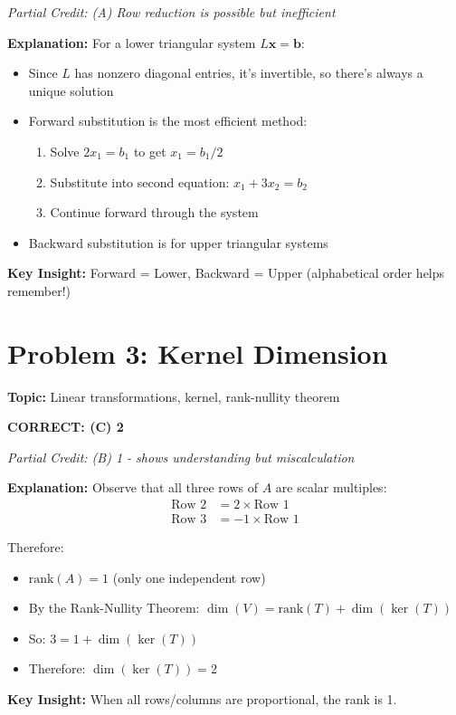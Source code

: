 \documentclass[12pt]{amsart}
\newcommand{\correct}[1]{{\color{blue}\textbf{CORRECT: #1}}}
\newcommand{\partcred}[1]{{\color{red}\textit{Partial Credit: #1}}}
\newcommand{\hint}{\textbf{Key Insight: }}
\begin{document}
\partcred{(A) Row reduction is possible but inefficient}

\textbf{Explanation:} For a lower triangular system $L\mathbf{x} = \mathbf{b}$:
\begin{itemize}
\item Since $L$ has nonzero diagonal entries, it's invertible, so there's always a unique solution
\item Forward substitution is the most efficient method:
  \begin{enumerate}
  \item Solve $2x_1 = b_1$ to get $x_1 = b_1/2$
  \item Substitute into second equation: $x_1 + 3x_2 = b_2$
  \item Continue forward through the system
  \end{enumerate}
\item Backward substitution is for upper triangular systems
\end{itemize}

\hint Forward = Lower, Backward = Upper (alphabetical order helps remember!)

\hrulefill

\section*{Problem 3: Kernel Dimension}
\textbf{Topic:} Linear transformations, kernel, rank-nullity theorem

\correct{(C) 2}

\partcred{(B) 1 - shows understanding but miscalculation}

\textbf{Explanation:} 
Observe that all three rows of $A$ are scalar multiples:
\begin{align}
\text{Row 2} &= 2 \times \text{Row 1}\\
\text{Row 3} &= -1 \times \text{Row 1}
\end{align}

Therefore:
\begin{itemize}
\item $\text{rank}(A) = 1$ (only one independent row)
\item By the Rank-Nullity Theorem: $\dim(V) = \text{rank}(T) + \dim(\ker(T))$
\item So: $3 = 1 + \dim(\ker(T))$
\item Therefore: $\dim(\ker(T)) = 2$
\end{itemize}

\hint When all rows/columns are proportional, the rank is 1.
\end{document}
